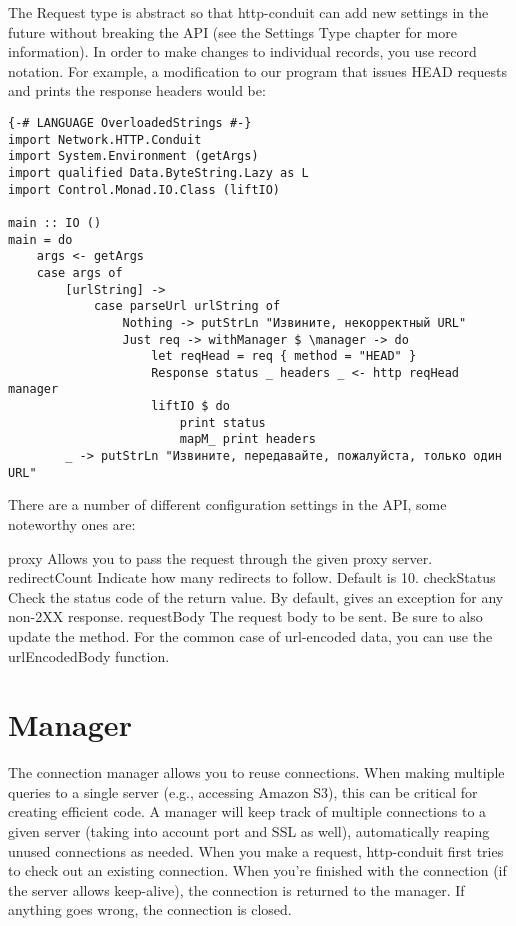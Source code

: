 The Request type is abstract so that http-conduit can add new settings
in the future without breaking the API (see the Settings Type chapter
for more information). In order to make changes to individual records,
you use record notation. For example, a modification to our program
that issues HEAD requests and prints the response headers would be:
\begin{lstlisting}
{-# LANGUAGE OverloadedStrings #-}
import Network.HTTP.Conduit
import System.Environment (getArgs)
import qualified Data.ByteString.Lazy as L
import Control.Monad.IO.Class (liftIO)

main :: IO ()
main = do
    args <- getArgs
    case args of
        [urlString] ->
            case parseUrl urlString of
                Nothing -> putStrLn "Извините, некорректный URL"
                Just req -> withManager $ \manager -> do
                    let reqHead = req { method = "HEAD" }
                    Response status _ headers _ <- http reqHead manager
                    liftIO $ do
                        print status
                        mapM_ print headers
        _ -> putStrLn "Извините, передавайте, пожалуйста, только один URL"
\end{lstlisting} %

There are a number of different configuration settings in the API,
some noteworthy ones are:

    proxy
      Allows you to pass the request through the given proxy server.
    redirectCount
      Indicate how many redirects to follow. Default is 10.
    checkStatus
      Check the status code of the return value. By default, gives an
      exception for any non-2XX response.
    requestBody
      The request body to be sent. Be sure to also update the method. For the
      common case of url-encoded data, you can use the urlEncodedBody function.

\section{Manager}

The connection manager allows you to reuse connections. When making
multiple queries to a single server (e.g., accessing Amazon S3), this
can be critical for creating efficient code. A manager will keep track
of multiple connections to a given server (taking into account port
and SSL as well), automatically reaping unused connections as
needed. When you make a request, http-conduit first tries to check out
an existing connection. When you're finished with the connection (if
the server allows keep-alive), the connection is returned to the
manager. If anything goes wrong, the connection is closed.

